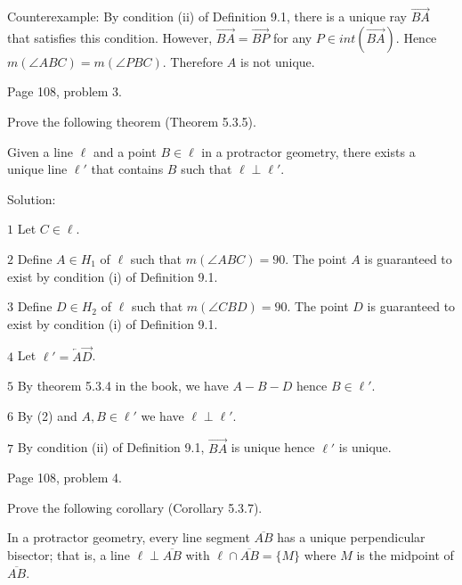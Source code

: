 \bigskip
\noindent
Counterexample:
By condition (ii) of Definition 9.1, there is a unique ray $\overrightarrow{BA}$ that
satisfies this condition.
However, $\overrightarrow{BA}=\overrightarrow{BP}$
for any $P\in int(\overrightarrow{BA})$.
Hence $m(\angle ABC)=m(\angle PBC)$.
Therefore $A$ is not unique.

\vfill
\eject

\beginsection Page 108, problem 3.

Prove the following theorem (Theorem 5.3.5).

\medskip
\noindent
Given a line $\ell$ and a point $B\in\ell$ in a protractor geometry, there
exists a unique line $\ell'$ that contains $B$ such that $\ell\perp\ell'$.

\bigskip
\noindent
Solution:

\medskip
\item{$\scriptstyle1$}
Let $C\in\ell$.

\medskip
\item{$\scriptstyle2$}
Define $A\in H_1$ of $\ell$ such that $m(\angle ABC)=90$.
The point $A$ is guaranteed to exist by condition (i) of Definition 9.1.

\medskip
\item{$\scriptstyle3$}
Define $D\in H_2$ of $\ell$ such that $m(\angle CBD)=90$.
The point $D$ is guaranteed to exist by condition (i) of Definition 9.1.

\medskip
\item{$\scriptstyle4$}
Let $\ell'=\overleftarrow A\overrightarrow D$.

\medskip
\item{$\scriptstyle5$}
By theorem 5.3.4 in the book, we have $A{-}B{-}D$ hence $B\in\ell'$.

\medskip
\item{$\scriptstyle6$}
By (2) and $A,B\in\ell'$ we have $\ell\perp\ell'$.

\medskip
\item{$\scriptstyle7$}
By condition (ii) of Definition 9.1, $\overrightarrow{BA}$ is unique hence $\ell'$ is unique.

\vfill
\eject

\beginsection Page 108, problem 4.

Prove the following corollary (Corollary 5.3.7).

\medskip
\noindent
In a protractor geometry, every line segment $\overline{AB}$ has a unique
perpendicular bisector; that is, a  line $\ell\perp\overline{AB}$
with $\ell\cap\overline{AB}=\{M\}$ where $M$ is the midpoint of $\overline{AB}$.

